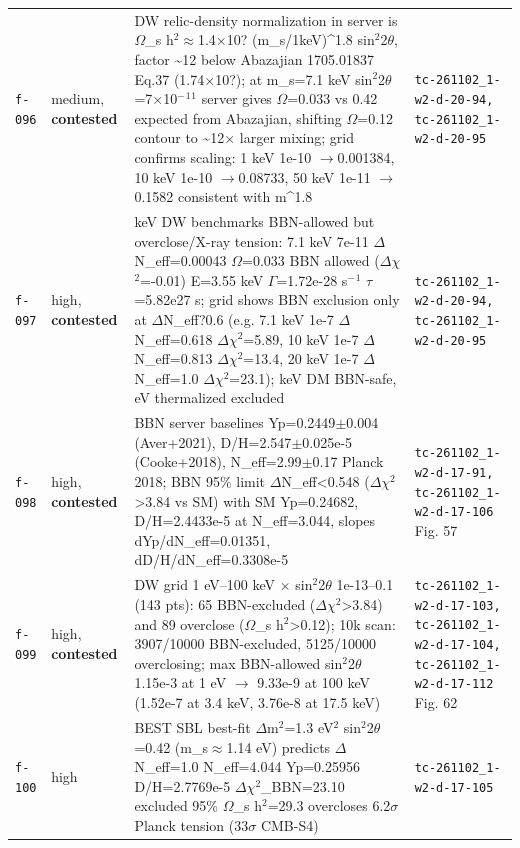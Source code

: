\documentclass[11pt,a4paper]{article}
\begin{document}
\begin{longtable}{@{}p{}p{}p{}p{}@{}}
\texttt{f-096} & medium, \textbf{contested} & DW relic-density normalization in server is $\Omega$\_s h$^2$$\approx$1.4$\times$10? (m\_s/1keV)\textasciicircum{}1.8 sin$^2$2$\theta$, factor \textasciitilde{}12 below Abazajian 1705.01837 Eq.37 (1.74$\times$10?); at m\_s=7.1 keV sin$^2$2$\theta$=7$\times$10$^-$$^1$$^1$ server gives $\Omega$=0.033 vs 0.42 expected from Abazajian, shifting $\Omega$=0.12 contour to \textasciitilde{}12$\times$ larger mixing; grid confirms scaling: 1 keV 1e-10 $\to$0.001384, 10 keV 1e-10 $\to$0.08733, 50 keV 1e-11 $\to$0.1582 consistent with m\textasciicircum{}1.8 & \texttt{tc-261102\_\allowbreak{}1-w2-d-20-94,\allowbreak{} tc-261102\_\allowbreak{}1-w2-d-20-95} \\
\texttt{f-097} & high, \textbf{contested} & keV DW benchmarks BBN-allowed but overclose/X-ray tension: 7.1 keV 7e-11 $\Delta$N\_eff=0.00043 $\Omega$=0.033 BBN allowed ($\Delta$$\chi$$^2$=-0.01) E=3.55 keV $\Gamma$=1.72e-28 s$^-$$^1$ $\tau$=5.82e27 s; grid shows BBN exclusion only at $\Delta$N\_eff?0.6 (e.g. 7.1 keV 1e-7 $\Delta$N\_eff=0.618 $\Delta$$\chi$$^2$=5.89, 10 keV 1e-7 $\Delta$N\_eff=0.813 $\Delta$$\chi$$^2$=13.4, 20 keV 1e-7 $\Delta$N\_eff=1.0 $\Delta$$\chi$$^2$=23.1); keV DM BBN-safe, eV thermalized excluded & \texttt{tc-261102\_\allowbreak{}1-w2-d-20-94,\allowbreak{} tc-261102\_\allowbreak{}1-w2-d-20-95} \\
\texttt{f-098} & high, \textbf{contested} & BBN server baselines Yp=0.2449$\pm$0.004 (Aver+2021), D/H=2.547$\pm$0.025e-5 (Cooke+2018), N\_eff=2.99$\pm$0.17 Planck 2018; BBN 95\% limit $\Delta$N\_eff\textless{}0.548 ($\Delta$$\chi$$^2$\textgreater{}3.84 vs SM) with SM Yp=0.24682, D/H=2.4433e-5 at N\_eff=3.044, slopes dYp/dN\_eff=0.01351, dD/H/dN\_eff=0.3308e-5 & \texttt{tc-261102\_\allowbreak{}1-w2-d-17-91,\allowbreak{} tc-261102\_\allowbreak{}1-w2-d-17-106} Fig. 57 \\
\texttt{f-099} & high, \textbf{contested} & DW grid 1 eV--100 keV $\times$ sin$^2$2$\theta$ 1e-13--0.1 (143 pts): 65 BBN-excluded ($\Delta$$\chi$$^2$\textgreater{}3.84) and 89 overclose ($\Omega$\_s h$^2$\textgreater{}0.12); 10k scan: 3907/10000 BBN-excluded, 5125/10000 overclosing; max BBN-allowed sin$^2$2$\theta$ 1.15e-3 at 1 eV $\to$ 9.33e-9 at 100 keV (1.52e-7 at 3.4 keV, 3.76e-8 at 17.5 keV) & \texttt{tc-261102\_\allowbreak{}1-w2-d-17-103,\allowbreak{} tc-261102\_\allowbreak{}1-w2-d-17-104,\allowbreak{} tc-261102\_\allowbreak{}1-w2-d-17-112} Fig. 62 \\
\texttt{f-100} & high & BEST SBL best-fit $\Delta$m$^2$=1.3 eV$^2$ sin$^2$2$\theta$=0.42 (m\_s$\approx$1.14 eV) predicts $\Delta$N\_eff=1.0 N\_eff=4.044 Yp=0.25956 D/H=2.7769e-5 $\Delta$$\chi$$^2$\_BBN=23.10 excluded 95\% $\Omega$\_s h$^2$=29.3 overcloses 6.2$\sigma$ Planck tension (33$\sigma$ CMB-S4) & \texttt{tc-261102\_\allowbreak{}1-w2-d-17-105} \\

\end{longtable}
\end{document}
